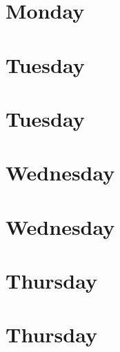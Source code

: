 \documentclass[12pt,a4paper,oneside,openany,extrafontsizes]{memoir}
\newcommand{\inputDay}[1]{
\hspace{-8mm}
   \scalebox{0.78}{}
}
\renewcommand{\bf}{\textbf}
\begin{document}
\frontmatter

\thispagestyle{empty}

\mainmatter
\setlength{\beforechapskip}{0mm}
\renewcommand*\hourheight{7.4em}
\renewcommand*\daywidth{23cm}
\renewcommand*\titlewidth{11cm}
\renewcommand*\sessionWidth{1.5cm}
\chapter*[Monday 17/9/2012\\QEST 2012 Workshops \& Tutorials]{Monday}
\inputDay{generated/qest0}%
\renewcommand*\titlewidth{19.8cm}
\chapter*[Tuesday 18/9/2012\\QEST]{Tuesday}
\inputDay{generated/qest1}%
\chapter*[Tuesday 18/9/2012\\FORMATS]{Tuesday}
\inputDay{generated/formats1}%
\chapter*[Wednesday 19/9/2012\\QEST]{Wednesday}
\inputDay{generated/qest2}%
\chapter*[Wednesday 19/9/2012\\FORMATS]{Wednesday}
\inputDay{generated/formats2}%
\chapter*[Thursday 20/9/2012\\QEST]{Thursday}
\inputDay{generated/qest3}%
\chapter*[Thursday 20/9/2012\\FORMATS]{Thursday}
\inputDay{generated/formats3}%
\end{document}
